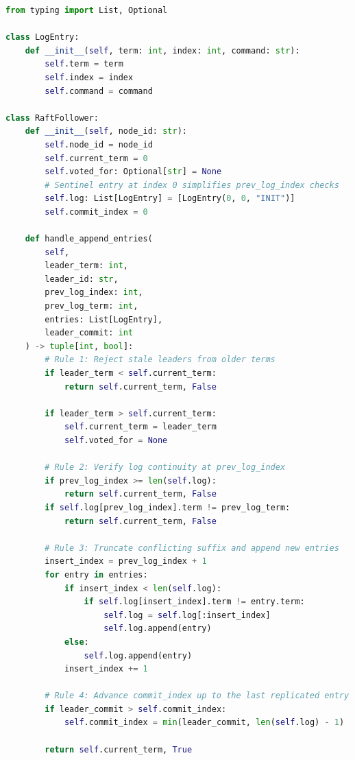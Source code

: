 \begin{lstlisting}[language=Python, caption={Raft Follower Log Replication and Conflict-Repair RPC Handler}]
from typing import List, Optional

class LogEntry:
    def __init__(self, term: int, index: int, command: str):
        self.term = term
        self.index = index
        self.command = command

class RaftFollower:
    def __init__(self, node_id: str):
        self.node_id = node_id
        self.current_term = 0
        self.voted_for: Optional[str] = None
        # Sentinel entry at index 0 simplifies prev_log_index checks
        self.log: List[LogEntry] = [LogEntry(0, 0, "INIT")]
        self.commit_index = 0

    def handle_append_entries(
        self,
        leader_term: int,
        leader_id: str,
        prev_log_index: int,
        prev_log_term: int,
        entries: List[LogEntry],
        leader_commit: int
    ) -> tuple[int, bool]:
        # Rule 1: Reject stale leaders from older terms
        if leader_term < self.current_term:
            return self.current_term, False

        if leader_term > self.current_term:
            self.current_term = leader_term
            self.voted_for = None

        # Rule 2: Verify log continuity at prev_log_index
        if prev_log_index >= len(self.log):
            return self.current_term, False
        if self.log[prev_log_index].term != prev_log_term:
            return self.current_term, False

        # Rule 3: Truncate conflicting suffix and append new entries
        insert_index = prev_log_index + 1
        for entry in entries:
            if insert_index < len(self.log):
                if self.log[insert_index].term != entry.term:
                    self.log = self.log[:insert_index]
                    self.log.append(entry)
            else:
                self.log.append(entry)
            insert_index += 1

        # Rule 4: Advance commit_index up to the last replicated entry
        if leader_commit > self.commit_index:
            self.commit_index = min(leader_commit, len(self.log) - 1)

        return self.current_term, True
\end{lstlisting}

